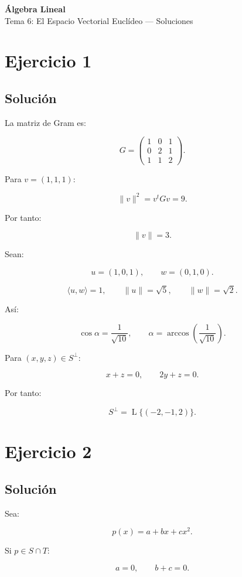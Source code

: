 \documentclass[11pt,a4paper]{article}
\newcommand{\Span}{\operatorname{L}}
\begin{document}
\begin{center}
{\LARGE\bfseries Álgebra Lineal}\\[0.4em]
{\Large Tema 6: El Espacio Vectorial Euclídeo --- Soluciones}
\end{center}

\section{Ejercicio 1}
\subsection{Solución}

La matriz de Gram es:

\[
\boxed{
G=
\begin{pmatrix}
1&0&1\\
0&2&1\\
1&1&2
\end{pmatrix}.
}
\]

Para $v=(1,1,1)$:

\[
\|v\|^2
=
v^tGv
=
9.
\]

Por tanto:

\[
\boxed{\|v\|=3.}
\]

Sean:

\[
u=(1,0,1),
\qquad
w=(0,1,0).
\]

\[
\langle u,w\rangle=1,
\qquad
\|u\|=\sqrt5,
\qquad
\|w\|=\sqrt2.
\]

Así:

\[
\boxed{
\cos\alpha=\frac1{\sqrt{10}},
\qquad
\alpha=\arccos\left(\frac1{\sqrt{10}}\right).
}
\]

Para $(x,y,z)\in S^\perp$:

\[
x+z=0,
\qquad
2y+z=0.
\]

Por tanto:

\[
\boxed{
S^\perp
=
\Span\{(-2,-1,2)\}.
}
\]

\section{Ejercicio 2}
\subsection{Solución}

Sea:

\[
p(x)=a+bx+cx^2.
\]

Si $p\in S\cap T$:

\[
a=0,
\qquad
b+c=0.
\]
\end{document}
